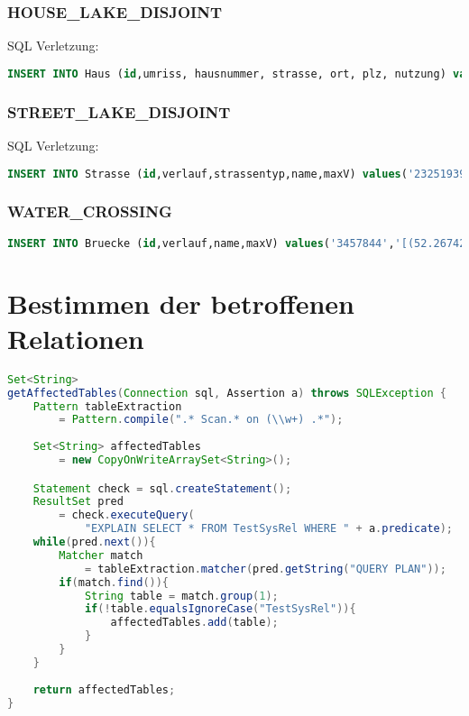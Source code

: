 \documentclass[a4paper]{article}
\begin{document}
\subsubsection{HOUSE\_LAKE\_DISJOINT}
SQL Verletzung:
\begin{lstlisting}[language=sql,breaklines=true]
INSERT INTO Haus (id,umriss, hausnummer, strasse, ort, plz, nutzung) values('3457843','((52.2593691,10.530547),(52.2593475,10.5305934),(52.2593108,10.530598),(52.2592873,10.5305653),(52.2592827,10.5305139),(52.2592984,10.5304732),(52.2593168,10.5304591),(52.2593452,10.5304646),(52.2593669,10.5305019),(52.2593691,10.530547))','42','Kasernenstrasse','Braunschweig','38102',NULL)
\end{lstlisting}

\subsubsection{STREET\_LAKE\_DISJOINT}
SQL Verletzung: 
\begin{lstlisting}[language=sql,breaklines=true]
INSERT INTO Strasse (id,verlauf,strassentyp,name,maxV) values('23251939','[(52.2601605,10.5313293),(52.2601389,10.5313757),(52.2601022,10.5313803),(52.2600787,10.5313476),(52.2600742,10.5312962),(52.2600898,10.5312555),(52.2601082,10.5312414),(52.2601366,10.5312469),(52.2601583,10.5312842),(52.2601605,10.5313293)]','residential','Neue Knochenhauerstrasse','0')
\end{lstlisting}

\subsubsection{WATER\_CROSSING}
\begin{lstlisting}[language=sql,breaklines=true]
INSERT INTO Bruecke (id,verlauf,name,maxV) values('3457844','[(52.2674258,10.5246387),(52.2669683,10.5250233)]','Leonhardstrasse','30')
\end{lstlisting}

\section{Bestimmen der betroffenen Relationen}

\begin{lstlisting}[language=java]
Set<String>
getAffectedTables(Connection sql, Assertion a) throws SQLException {
    Pattern tableExtraction
        = Pattern.compile(".* Scan.* on (\\w+) .*");
    
    Set<String> affectedTables
        = new CopyOnWriteArraySet<String>();

    Statement check = sql.createStatement();
    ResultSet pred
        = check.executeQuery(
            "EXPLAIN SELECT * FROM TestSysRel WHERE " + a.predicate);                
    while(pred.next()){
        Matcher match
            = tableExtraction.matcher(pred.getString("QUERY PLAN"));
        if(match.find()){
            String table = match.group(1);
            if(!table.equalsIgnoreCase("TestSysRel")){
                affectedTables.add(table);
            }
        }
    }
    
    return affectedTables;
}
\end{lstlisting}
\end{document}
